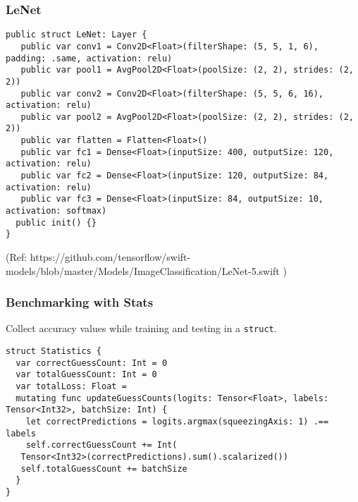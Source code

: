 \begin{frame}[fragile] \frametitle{LeNet}

\begin{lstlisting}[basicstyle=\scriptsize]
public struct LeNet: Layer {
   public var conv1 = Conv2D<Float>(filterShape: (5, 5, 1, 6), padding: .same, activation: relu)
   public var pool1 = AvgPool2D<Float>(poolSize: (2, 2), strides: (2, 2))
   public var conv2 = Conv2D<Float>(filterShape: (5, 5, 6, 16), activation: relu)
   public var pool2 = AvgPool2D<Float>(poolSize: (2, 2), strides: (2, 2))
   public var flatten = Flatten<Float>()
   public var fc1 = Dense<Float>(inputSize: 400, outputSize: 120, activation: relu)
   public var fc2 = Dense<Float>(inputSize: 120, outputSize: 84, activation: relu)
   public var fc3 = Dense<Float>(inputSize: 84, outputSize: 10, activation: softmax)
  public init() {}
}
\end{lstlisting}

{\tiny (Ref: https://github.com/tensorflow/swift-models/blob/master/Models/ImageClassification/LeNet-5.swift )}

\end{frame}

\begin{frame}[fragile] \frametitle{Benchmarking with Stats}

Collect accuracy values while training and testing in a \lstinline|struct|.

\begin{lstlisting}[basicstyle=\scriptsize]
struct Statistics {
  var correctGuessCount: Int = 0
  var totalGuessCount: Int = 0
  var totalLoss: Float =
  mutating func updateGuessCounts(logits: Tensor<Float>, labels: Tensor<Int32>, batchSize: Int) {
    let correctPredictions = logits.argmax(squeezingAxis: 1) .== labels
    self.correctGuessCount += Int(
   Tensor<Int32>(correctPredictions).sum().scalarized())
   self.totalGuessCount += batchSize
  }
}
\end{lstlisting}

\end{frame}


